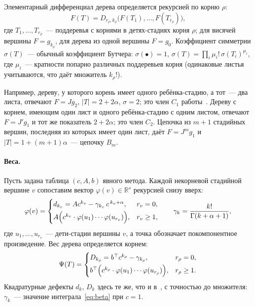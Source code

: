 \begin{definition}\label{def:F}
Элементарный дифференциал дерева определяется рекурсией по корню $\rho$:
\[
F(T)=D_{r_\rho,k_\rho}\bigl(F(T_1),\dots,F(T_{r_\rho})\bigr),
\]
где $T_1,\dots,T_{r_\rho}$~--- поддеревья с корнями в детях-стадиях корня $\rho$; для висячей вершины $F=g_{k_\rho}$, для дерева из одной вершины $F=g_0$. Коэффициент симметрии $\sigma(T)$~--- обычный коэффициент Бутчера: $\sigma(\bullet)=1$, $\sigma(T)=\prod_i\mu_i!\,\sigma(T_i)^{\mu_i}$, где $\mu_i$~--- кратности попарно различных поддеревьев корня (одинаковые листья учитываются, что даёт множитель $k_\rho!$).
\end{definition}

Например, дереву, у которого корень имеет одного ребёнка-стадию, а тот~--- два листа, отвечают $F=Jg_2$, $|T|=2+2\alpha$, $\sigma=2$; это член $C_1$ работы~\cite{PrikBarriers}. Дереву с корнем, имеющим один лист и одного ребёнка-стадию с одним листом, отвечают $F=J'g_1$ и тот же показатель $2+2\alpha$; это член $C_2$. Цепочка из $m+1$ стадийных вершин, последняя из которых имеет один лист, даёт $F=J^mg_1$ и $|T|=1+(m+1)\alpha$~--- цепочку $B_m$.

\paragraph{Веса.} Пусть задана таблица $(c,A,b)$ явного метода. Каждой некорневой стадийной вершине $v$ сопоставим вектор $\varphi(v)\in\mathbb R^s$ рекурсией снизу вверх:
\begin{equation}\label{eq:phi}
\varphi(v)=\begin{cases}
d_{k_v}=Ac^{k_v}-\gamma_{k_v}\,c^{\,k_v+\alpha}, & r_v=0,\\[1mm]
A\Bigl(c^{k_v}\cdot\varphi(u_1)\cdots\varphi(u_{r_v})\Bigr), & r_v\ge1,
\end{cases}
\qquad \gamma_k=\frac{k!}{\Gamma(k+\alpha+1)},
\end{equation}
где $u_1,\dots,u_{r_v}$~--- дети-стадии вершины $v$, а точка обозначает покомпонентное произведение. Вес дерева определяется корнем:
\begin{equation}\label{eq:Psi}
\Psi(T)=\begin{cases}
D_{k_\rho}=b^{\top}c^{k_\rho}-\gamma_{k_\rho}, & r_\rho=0,\\[1mm]
b^{\top}\Bigl(c^{k_\rho}\cdot\varphi(u_1)\cdots\varphi(u_{r_\rho})\Bigr), & r_\rho\ge1.
\end{cases}
\end{equation}
Квадратурные дефекты $d_k$, $D_k$ здесь те же, что и в~\cite{PrikBarriers}, с точностью до множителя: $\gamma_k$~--- значение интеграла~\eqref{eq:beta} при $c=1$.

